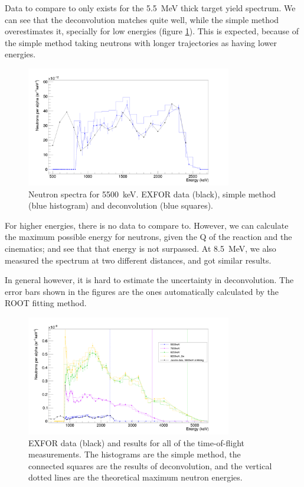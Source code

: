 \documentclass[a4paper,12pt]{report}
\begin{document}
Data to compare to only exists for the \qty{5.5}{\MeV} thick target yield spectrum.
We can see that the deconvolution matches quite well, while the simple method overestimates it, specially for low energies (figure \ref{pulsed_5mev}).
This is expected, because of the simple method taking neutrons with longer trajectories as having lower energies.

\begin{figure}[H]
	\centering
	\includegraphics[width=0.80\textwidth]{pulsed_5mev.png}
	\caption{Neutron spectra for \qty{5500}{\keV}.
	EXFOR data (black), simple method (blue histogram) and deconvolution (blue squares).}
	\label{pulsed_5mev}
\end{figure}

For higher energies, there is no data to compare to.
However, we can calculate the maximum possible energy for neutrons, given the Q of the reaction and the cinematics; and see that that energy is not surpassed.
At \qty{8.5}{\MeV}, we also measured the spectrum at two different distances, and got similar results.

In general however, it is hard to estimate the uncertainty in deconvolution.
The error bars shown in the figures are the ones automatically calculated by the ROOT fitting method.

\begin{figure}[H]
	\centering
	\includegraphics[width=0.80\textwidth]{pulsed_results.png}
	\caption{EXFOR data (black) and results for all of the time-of-flight measurements.
	The histograms are the simple method, the connected squares are the results of deconvolution, and the vertical dotted lines are the theoretical maximum neutron energies.}
	\label{pulsed_results}
\end{figure}
\end{document}

